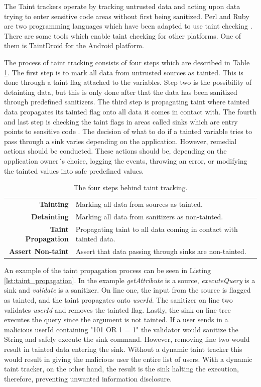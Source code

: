 The Taint trackers operate by tracking untrusted data and acting upon data trying to enter sensitive code areas without first being sanitized. Perl and Ruby are two programming languages which have been adapted to use taint checking \parencite{perl, ruby}. There are some tools which enable taint checking for other platforms. One of them is TaintDroid \parencite{Ma2010} for the Android platform.

The process of taint tracking consists of four steps which are described in Table \ref{table:taintTracking}. The first step is to mark all data from untrusted sources as tainted. This is done through a taint flag attached to the variables. Step two is the possibility of detainting data, but this is only done after that the data has been sanitized through predefined sanitizers. The third step is propagating taint where tainted data propagates its tainted flag onto all data it comes in contact with. The fourth and last step is checking the taint flags in areas called sinks which are entry points to sensitive code \parencite{Pan2015, Venkataramani2008}. The decision of what to do if a tainted variable tries to pass through a sink varies depending on the application. However, remedial actions should be conducted. These actions should be, depending on the application owner´s choice, logging the events, throwing an error, or modifying the tainted values into safe predefined values. 

\begin{table}[H]
  \centering
  \caption{The four steps behind taint tracking.}
  \label{table:taintTracking}
  \begin{tabular}{rp{8.5cm}}
    \textbf{Tainting}           & Marking all data from sources as tainted.                          \\
    \textbf{Detainting}         & Marking all data from sanitizers as non-tainted.                   \\
    \textbf{Taint Propagation}     & Propagating taint to all data coming in contact with tainted data. \\
    \textbf{Assert Non-taint} & Assert that data passing through sinks are non-tainted.           
  \end{tabular}
\end{table}

An example of the taint propagation process can be seen in Listing \ref{lst:taint_propagation}. In the example \textit{getAttribute} is a source, \textit{executeQuery} is a sink and \textit{validate} is a sanitizer. On line one, the input from the source is flagged as tainted, and the taint propagates onto \textit{userId}. The sanitizer on line two validates \textit{userId} and removes the tainted flag. Lastly, the sink on line tree executes the query since the argument is not tainted. If a user sends in a malicious userId containing "101 OR 1 = 1" the validator would sanitize the String and safely execute the sink command. However, removing line two would result in tainted data entering the sink. Without a dynamic taint tracker this would result in giving the malicious user the entire list of users. With a dynamic taint tracker, on the other hand, the result is the sink halting the execution, therefore, preventing unwanted information disclosure.

